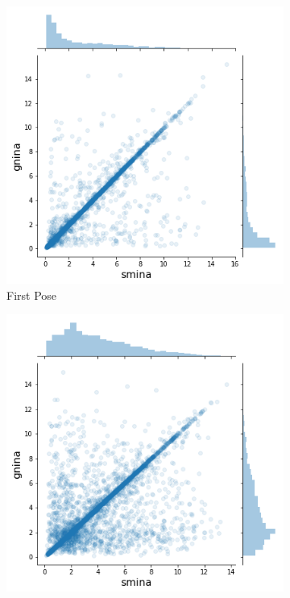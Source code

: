 \documentclass[journal=jcisd8,manuscript=article]{achemso}
\begin{document}
\begin{figure}
    \centering
    \begin{subfigure}[b]{0.32\textwidth}
        \centering
        \includegraphics[width=\textwidth]{figures/other/firstpose.png}
        \caption{First Pose}
        \label{fig:SminaCompareOne}
    \end{subfigure}
    \begin{subfigure}[b]{0.32\textwidth}
        \centering
        \includegraphics[width=\textwidth]{figures/other/secondpose.png}

\end{subfigure}
\end{figure}
\end{document}
